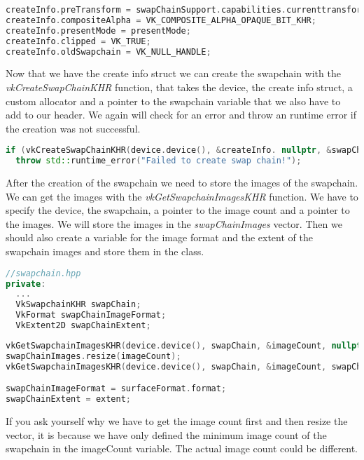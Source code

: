 \documentclass[12pt]{report} \usepackage{preamble}
\begin{document}
\begin{lstlisting}[language=C++]
createInfo.preTransform = swapChainSupport.capabilities.currenttransform;
createInfo.compositeAlpha = VK_COMPOSITE_ALPHA_OPAQUE_BIT_KHR;
createInfo.presentMode = presentMode;
createInfo.clipped = VK_TRUE;
createInfo.oldSwapchain = VK_NULL_HANDLE;
\end{lstlisting}

Now that we have the create info struct we can create the swapchain with the \textit{vkCreateSwapChainKHR}
function, that takes the device, the create info struct, a custom allocator and a pointer to the swapchain
variable that we also have to add to our header. We again will check for an error and throw an runtime
error if the creation was not successful.

\begin{lstlisting}[language=C++]
if (vkCreateSwapChainKHR(device.device(), &createInfo. nullptr, &swapChain) != VK_SUCCESS)
  throw std::runtime_error("Failed to create swap chain!");
\end{lstlisting}

After the creation of the swapchain we need to store the images of the swapchain. We can get the images
with the \textit{vkGetSwapchainImagesKHR} function. We have to specify the device, the swapchain, a pointer
to the image count and a pointer to the images. We will store the images in the \textit{swapChainImages}
vector. Then we should also create a variable for the image format and the extent of the swapchain images
and store them in the class.

\begin{lstlisting}[language=C++]
//swapchain.hpp
private:
  ...
  VkSwapchainKHR swapChain;
  VkFormat swapChainImageFormat;
  VkExtent2D swapChainExtent;
\end{lstlisting}

\begin{lstlisting}[language=C++]
vkGetSwapchainImagesKHR(device.device(), swapChain, &imageCount, nullptr);
swapChainImages.resize(imageCount);
vkGetSwapchainImagesKHR(device.device(), swapChain, &imageCount, swapChainImages.data());

swapChainImageFormat = surfaceFormat.format;
swapChainExtent = extent;
\end{lstlisting}

If you ask yourself why we have to get the image count first and then resize the vector, it is because
we have only defined the minimum image count of the swapchain in the imageCount variable. The actual
image count could be different.
\end{document}
